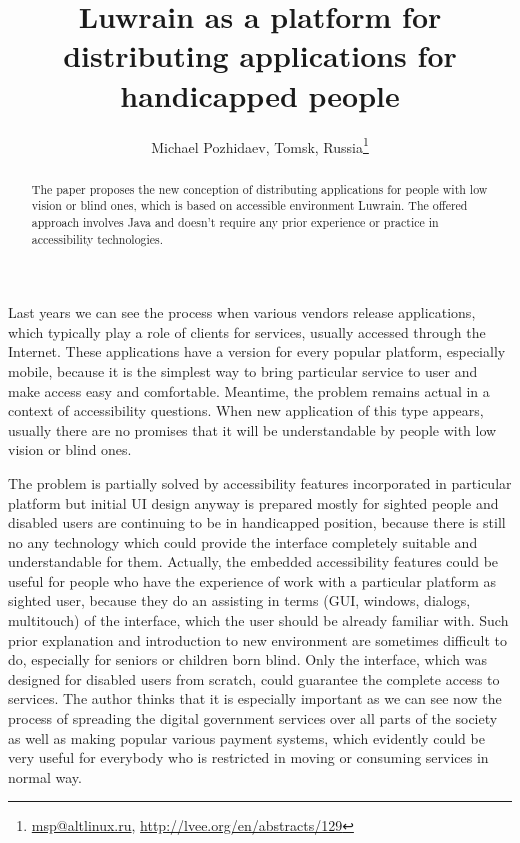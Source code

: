 \documentclass[10pt, a5paper]{article}
\begin{document}
\title{Luwrain as a platform for distributing applications for handicapped people}
\author{Michael Pozhidaev, Tomsk, Russia\footnote{\url{msp@altlinux.ru}, \url{http://lvee.org/en/abstracts/129}}}
\maketitle
\begin{abstract}
The paper proposes the new conception of distributing appli\-cations for people with low vision or blind ones, which is based on accessible environment Luwrain. The offered approach involves Java and doesn't require any prior experience or practice in accessibility technologies.
\end{abstract}
Last years we can see the process when various vendors release applica\-tions, which typically play a role of clients for services, usually accessed through the Internet. These applications have a version for every popu\-lar platform, especially mobile, because it is the simplest way to bring particular service to user and make access easy and comfortable. Mean\-time, the problem remains actual in a context of accessibility questions. When new application of this type appears, usually there are no promi\-ses that it will be understandable by people with low vision or blind ones.

The problem is partially solved by accessibility features incorporated in particular platform but initial UI design anyway is prepared mostly for sighted people and disabled users are continuing to be in handicap\-ped position, because there is still no any technology which could provide the interface completely suitable and understandable for them. Actually, the embedded accessibility features could be useful for people who have the experience of work with a particular platform as sighted user, because they do an assisting in terms (GUI, windows, dialogs, multitouch) of the interface, which the user should be already familiar with. Such prior explanation and introduction to new environment are sometimes difficult to do, especially for seniors or children born blind. Only the interface, which was designed for disabled users from scratch, could guarantee the complete access to services. The author thinks that it is especially important as we can see now the process of spreading the digital government services over all parts of the society as well as making popular various payment systems, which evidently could be very useful for everybody who is restricted in moving or consuming services in normal way.
\end{document}
